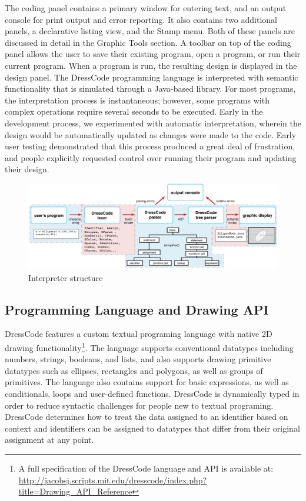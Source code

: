 \documentclass{sigchi}
\begin{document}
The coding panel contains a primary window for entering text, and an output console for print output and error reporting. It also contains two additional panels, a declarative listing view, and the Stamp menu. Both of these panels are discussed in detail in the Graphic Tools section. A toolbar on top of the coding panel allows the user to save their existing program, open a program, or run their current program. When a program is run, the resulting design is displayed in the design panel. The DressCode programming language is interpreted with semantic functionality that is simulated through a Java-based library. For most programs, the interpretation process is instantaneous; however, some programs with complex operations require several seconds to be executed. Early in the development process, we experimented with automatic interpretation, wherein the design would be automatically updated as changes were made to the code. Early user testing demonstrated that this process produced a great deal of frustration, and people explicitly requested control over running their program and updating their design.

\begin{center}
\begin{figure}[h!]
\includegraphics[width=\textwidth]{images/interpreter_structure_horz.png}
\caption{Interpreter structure}
\label{fig:interpreter_structure}
\end{figure}
\end{center}

\subsection{Programming Language and Drawing API}
DressCode features a custom textual programing language with native 2D drawing functionality\footnote{A full specification of the DressCode language and API is available at: \url{http://jacobsj.scripts.mit.edu/dresscode/index.php?title=Drawing_API_Reference}}. The language supports conventional datatypes including numbers, strings, booleans, and lists, and also supports drawing primitive datatypes such as ellipses, rectangles and polygons, as well as groups of primitives. The language also contains support for basic expressions, as well as conditionals, loops and user-defined functions. DressCode is dynamically typed in order to reduce syntactic challenges for people new to textual programing. DressCode determines how to treat the data assigned to an identifier based on context and identifiers can be assigned to datatypes that differ from their original assignment at any point. 
\end{document}
